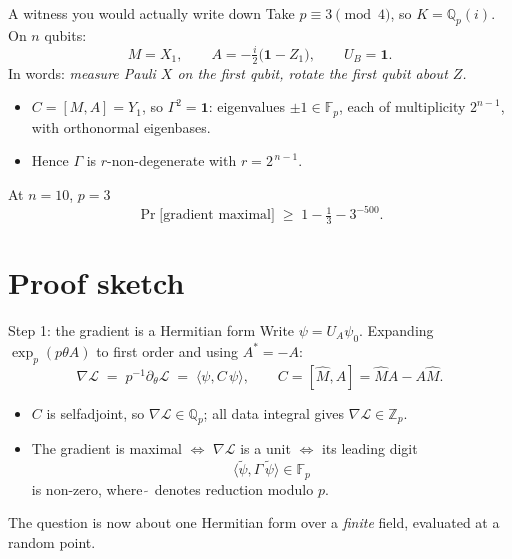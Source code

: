\documentclass[aspectratio=169,compress]{beamer}
\newcommand{\Qp}{\mathbb{Q}_p}
\newcommand{\Zp}{\mathbb{Z}_p}
\newcommand{\FF}{\mathbb{F}}
\newcommand{\Id}{\mathbf{1}}
\newcommand{\loss}{\mathcal{L}}
\newcommand{\inner}[2]{\langle #1, #2\rangle}
\begin{document}
\begin{frame}{A witness you would actually write down}
  Take $p\equiv3\pmod4$, so $K=\Qp(i)$. On $n$ qubits:
  \[
    M=X_1,
    \qquad
    A=-\tfrac{i}{2}\bigl(\Id-Z_1\bigr),
    \qquad U_B=\Id .
  \]
  In words: \emph{measure Pauli $X$ on the first qubit, rotate the first
  qubit about $Z$.}
  \vspace{0.4em}
  \begin{itemize}
    \item $C=[M,A]=Y_1$, so $\Gamma^{2}=\Id$: eigenvalues $\pm1\in\FF_p$, each
      of multiplicity $2^{n-1}$, with orthonormal eigenbases.
    \item Hence $\Gamma$ is $r$-non-degenerate with $r=2^{\,n-1}$.
  \end{itemize}
  \begin{exampleblock}{At $n=10$, $p=3$}
    \[
      \Pr\bigl[\text{gradient maximal}\bigr]\;\ge\;1-\tfrac13-3^{-500}.
    \]
  \end{exampleblock}
\end{frame}

\section[Proof]{Proof sketch}

\begin{frame}{Step 1: the gradient is a Hermitian form}
  Write $\psi=U_A\psi_0$. Expanding $\exp_p(p\theta A)$ to first order and
  using $A^{*}=-A$:
  \[
    \nabla\loss\;=\;p^{-1}\partial_\theta\loss
    \;=\;\inner{\psi}{C\,\psi},
    \qquad
    C=[\widehat M,A]=\widehat MA-A\widehat M .
  \]
  \begin{itemize}
    \item $C$ is selfadjoint, so $\nabla\loss\in\Qp$; all data integral gives
      $\nabla\loss\in\Zp$.
    \item The gradient is maximal $\iff$ $\nabla\loss$ is a unit $\iff$ its
      \alert{leading digit}
      \[
        \inner{\tilde\psi}{\Gamma\,\tilde\psi}\in\FF_p
      \]
      is non-zero, where $\tilde{\ }$ denotes reduction modulo $p$.
  \end{itemize}
  \vspace{0.3em}
  The question is now about one Hermitian form over a \emph{finite} field,
  evaluated at a random point.
\end{frame}
\end{document}
